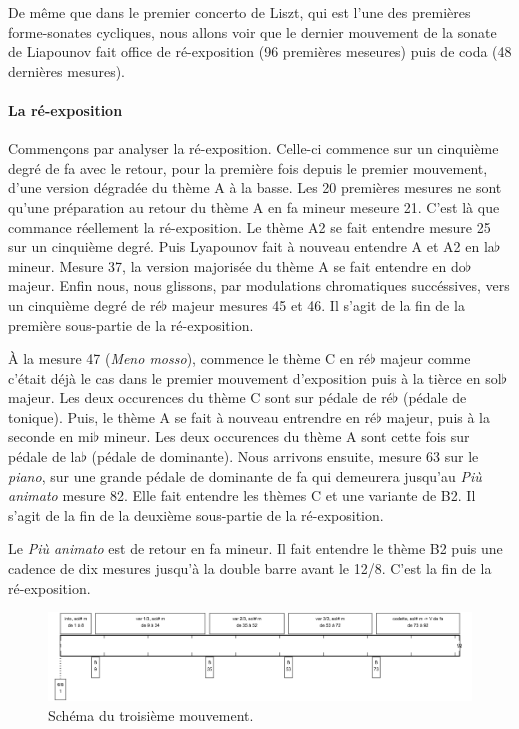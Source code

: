 De même que dans le premier concerto de Liszt, qui est l'une des premières forme-sonates cycliques, nous allons voir que le dernier mouvement de la sonate de Liapounov fait office de ré-exposition (96 premières meseures) puis de coda (48 dernières mesures).

\paragraph{La ré-exposition}

Commençons par analyser la ré-exposition. Celle-ci commence sur un cinquième degré de fa avec le retour, pour la première fois depuis le premier mouvement, d'une version dégradée du thème A à la basse. Les 20 premières mesures ne sont qu'une préparation au retour du thème A en fa mineur meseure 21. C'est là que commance réellement la ré-exposition. Le thème A2 se fait entendre mesure 25 sur un cinquième degré. Puis Lyapounov fait à nouveau entendre A et A2 en la$\flat$ mineur. Mesure 37, la version majorisée du thème A se fait entendre en do$\flat$ majeur. Enfin nous, nous glissons, par modulations chromatiques succéssives, vers un cinquième degré de ré$\flat$ majeur mesures 45 et 46. Il s'agit de la fin de la première sous-partie de la ré-exposition.

À la mesure 47 (\emph{Meno mosso}), commence le thème C en ré$\flat$ majeur comme c'était déjà le cas dans le premier mouvement d'exposition puis à la tièrce en sol$\flat$ majeur. Les deux occurences du thème C sont sur pédale de ré$\flat$ (pédale de tonique). Puis, le thème A se fait à nouveau entrendre en ré$\flat$ majeur, puis à la seconde en mi$\flat$ mineur. Les deux occurences du thème A sont cette fois sur pédale de la$\flat$ (pédale de dominante).
Nous arrivons ensuite, mesure 63 sur le \emph{piano}, sur une grande pédale de dominante de fa qui demeurera jusqu'au \emph{Più animato} mesure 82. Elle fait entendre les thèmes C et une variante de B2. Il s'agit de la fin de la deuxième sous-partie de la ré-exposition.

Le \emph{Più animato} est de retour en fa mineur. Il fait entendre le thème B2 puis une cadence de dix mesures jusqu'à la double barre avant le 12/8. C'est la fin de la ré-exposition.

\begin{figure}[!ht]
  \begin{bigcenter}
    \includegraphics[width=15cm, keepaspectratio]{frise-mvt3.png}
  \end{bigcenter}
  \caption{\label{schema-3}Schéma du troisième mouvement.}
\end{figure}

